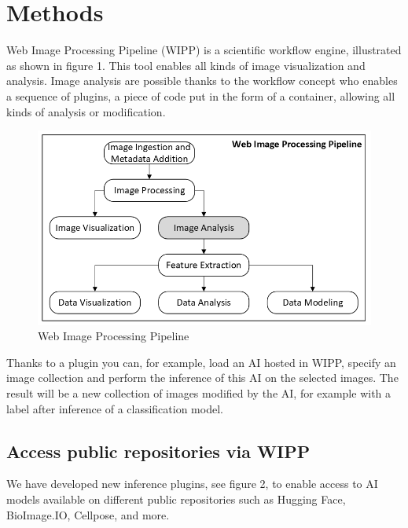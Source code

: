 \section{Methods}
\label{sec:methods}

Web Image Processing Pipeline (WIPP) is a scientific workflow engine,
illustrated as shown in figure 1. This tool enables all kinds of image
visualization and analysis. Image analysis are possible thanks to the workflow
concept who enables a sequence of plugins, a piece of code put in the form of a
container, allowing all kinds of analysis or modification.

\begin{figure}[H]
  \centering
  \includegraphics[width=1.0\linewidth]{png/1_wipp.png}
  \caption{Web Image Processing Pipeline}
  \label{fig:1wipp}
\end{figure}

Thanks to a plugin you can, for example, load an AI hosted in WIPP, specify an
image collection and perform the inference of this AI on the selected images.
The result will be a new collection of images modified by the AI, for example
with a label after inference of a classification model.

\subsection{Access public repositories via WIPP}

We have developed new inference plugins, see figure 2, to enable access to AI
models available on different public repositories such as Hugging Face,
BioImage.IO, Cellpose, and more.

